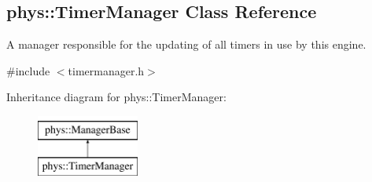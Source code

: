 \hypertarget{classphys_1_1TimerManager}{
\subsection{phys::TimerManager Class Reference}
\label{classphys_1_1TimerManager}
}


A manager responsible for the updating of all timers in use by this engine.  




{\ttfamily \#include $<$timermanager.h$>$}

Inheritance diagram for phys::TimerManager:\begin{figure}[H]
\begin{center}
\leavevmode
\includegraphics[height=2.000000cm]{classphys_1_1TimerManager}
\end{center}
\end{figure}
